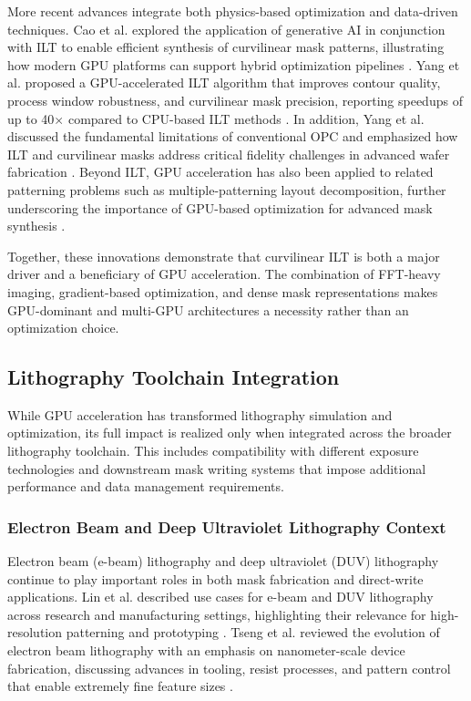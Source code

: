 \documentclass[pdflatex,sn-mathphys-num]{sn-jnl}%
\theoremstyle{thmstyleone}%
\theoremstyle{thmstyletwo}%
\theoremstyle{thmstylethree}%
\begin{document}
More recent advances integrate both physics-based optimization and data-driven techniques. Cao et al. explored the application of generative AI in conjunction with ILT to enable efficient synthesis of curvilinear mask patterns, illustrating how modern GPU platforms can support hybrid optimization pipelines \cite{Cao2023}. Yang et al. proposed a GPU-accelerated ILT algorithm that improves contour quality, process window robustness, and curvilinear mask precision, reporting speedups of up to 40$\times$ compared to CPU-based ILT methods \cite{Yang2025}. In addition, Yang et al. discussed the fundamental limitations of conventional OPC and emphasized how ILT and curvilinear masks address critical fidelity challenges in advanced wafer fabrication \cite{Yang2025}. Beyond ILT, GPU acceleration has also been applied to related patterning problems such as multiple-patterning layout decomposition, further underscoring the importance of GPU-based optimization for advanced mask synthesis \cite{Chen2023MatrixCover}.

Together, these innovations demonstrate that curvilinear ILT is both a major driver and a beneficiary of GPU acceleration. The combination of FFT-heavy imaging, gradient-based optimization, and dense mask representations makes GPU-dominant and multi-GPU architectures a necessity rather than an optimization choice.


\subsection{Lithography Toolchain Integration}
While GPU acceleration has transformed lithography simulation and optimization, its full impact is realized only when integrated across the broader lithography toolchain. This includes compatibility with different exposure technologies and downstream mask writing systems that impose additional performance and data management requirements.

\subsubsection{Electron Beam and Deep Ultraviolet Lithography Context}
Electron beam (e-beam) lithography and deep ultraviolet (DUV) lithography continue to play important roles in both mask fabrication and direct-write applications. Lin et al. described use cases for e-beam and DUV lithography across research and manufacturing settings, highlighting their relevance for high-resolution patterning and prototyping \cite{Lin2020}. Tseng et al. reviewed the evolution of electron beam lithography with an emphasis on nanometer-scale device fabrication, discussing advances in tooling, resist processes, and pattern control that enable extremely fine feature sizes \cite{Tseng2003}.
\end{document}
